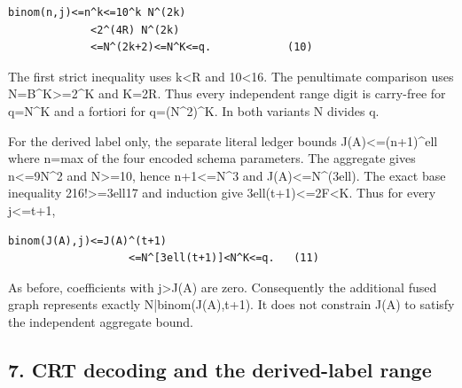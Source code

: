\begin{verbatim}
binom(n,j)<=n^k<=10^k N^(2k)
             <2^(4R) N^(2k)
             <=N^(2k+2)<=N^K<=q.            (10)
\end{verbatim}

The first strict inequality uses k\textless{}\allowbreak{}R and 10\textless{}\allowbreak{}16. The penultimate comparison uses N=\allowbreak{}B\textasciicircum{}\allowbreak{}K\textgreater{}\allowbreak{}=\allowbreak{}2\textasciicircum{}\allowbreak{}K and K=\allowbreak{}2R. Thus every independent range digit is carry-free for q=\allowbreak{}N\textasciicircum{}\allowbreak{}K and a fortiori for q=\allowbreak{}(N\textasciicircum{}\allowbreak{}2)\textasciicircum{}\allowbreak{}K. In both variants N divides q.



For the derived label only, the separate literal ledger bounds J(A)\textless{}\allowbreak{}=\allowbreak{}(n+\allowbreak{}1)\textasciicircum{}\allowbreak{}ell where n=\allowbreak{}max of the four encoded schema parameters. The aggregate gives n\textless{}\allowbreak{}=\allowbreak{}9N\textasciicircum{}\allowbreak{}2 and N\textgreater{}\allowbreak{}=\allowbreak{}10, hence n+\allowbreak{}1\textless{}\allowbreak{}=\allowbreak{}N\textasciicircum{}\allowbreak{}3 and J(A)\textless{}\allowbreak{}=\allowbreak{}N\textasciicircum{}\allowbreak{}(3ell). The exact base inequality 2\textasteriskcentered{}\allowbreak{}16!\textgreater{}\allowbreak{}=\allowbreak{}3ell\textasteriskcentered{}\allowbreak{}17 and induction give 3ell(t+\allowbreak{}1)\textless{}\allowbreak{}=\allowbreak{}2F\textless{}\allowbreak{}K. Thus for every j\textless{}\allowbreak{}=\allowbreak{}t+\allowbreak{}1,



\begin{verbatim}
binom(J(A),j)<=J(A)^(t+1)
                   <=N^[3ell(t+1)]<N^K<=q.   (11)
\end{verbatim}

As before, coefficients with j\textgreater{}\allowbreak{}J(A) are zero. Consequently the additional fused graph represents exactly N|binom(J(A),t+\allowbreak{}1). It does not constrain J(A) to satisfy the independent aggregate bound.



\subsection*{7. CRT decoding and the derived-label range}



